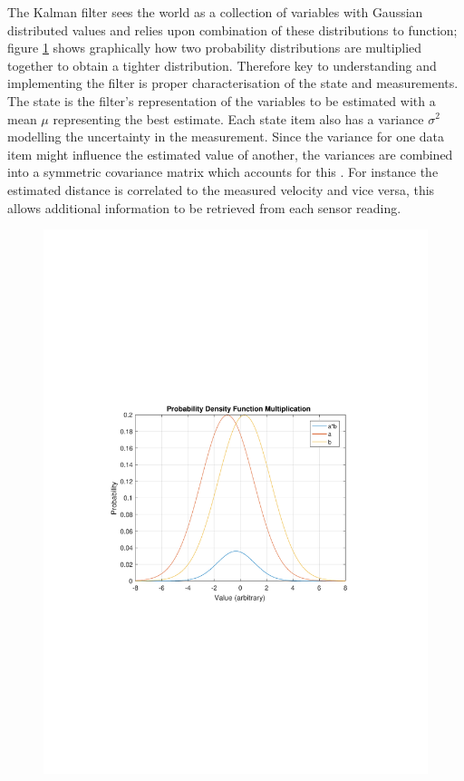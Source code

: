 	The Kalman filter sees the world as a collection of variables with Gaussian distributed values and relies upon combination of these distributions to function; figure \ref{fig:gaussiancombination} shows graphically how two probability distributions are multiplied together to obtain a tighter distribution. Therefore key to understanding and implementing the filter is proper characterisation of the state and measurements. The state is the filter's representation of the variables to be estimated with a mean \(\mu\) representing the best estimate. Each state item also has a variance \(\sigma^2\) modelling the uncertainty in the measurement. Since the variance for one data item might influence the estimated value of another, the variances are combined into a symmetric covariance matrix which accounts for this \cite{babb2015how}\cite{faragher2012basis}\cite{simon2001kalman}. For instance the estimated distance is correlated to the measured velocity and vice versa, this allows additional information to be retrieved from each sensor reading.\par

\begin{figure}[t!]
	\centering
	\includegraphics[height=0.35\textheight,trim={0cm 9cm 0cm 9cm},clip]{pdfmultiplication.pdf}
	\label{fig:gaussiancombination}
\end{figure}


